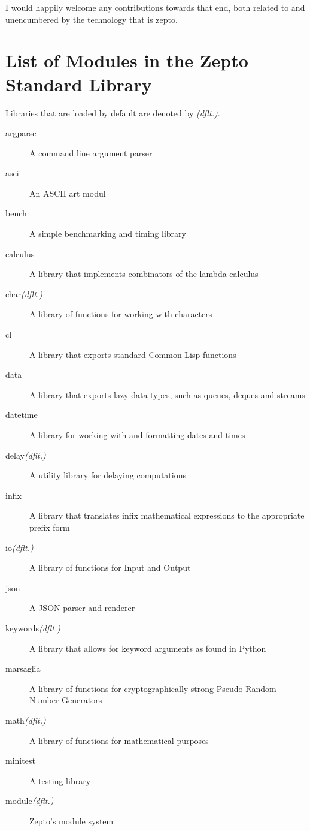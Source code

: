 \documentclass[oneside,11pt,xetex]{scrbook}
\begin{document}
I would happily welcome any contributions towards that
end, both related to and unencumbered by the technology
that is zepto.



\appendix

\chapter{List of Modules in the Zepto Standard Library}
\label{app:stdlib}

Libraries that are loaded by default are denoted by \textit{(dflt.)}.

\begin{description}
\item [argparse] A command line argument parser
\item [ascii] An ASCII art modul
\item [bench] A simple benchmarking and timing library
\item [calculus] A library that implements combinators of the lambda calculus
\item [char\textit{(dflt.)}] A library of functions for working with characters
\item [cl] A library that exports standard Common Lisp functions
\item [data] A library that exports lazy data types, such as queues, deques and streams
\item [datetime] A library for working with and formatting dates and times
\item [delay\textit{(dflt.)}] A utility library for delaying computations
\item [infix] A library that translates infix mathematical expressions to the appropriate
prefix form
\item [io\textit{(dflt.)}] A library of functions for Input and Output
\item [json] A JSON parser and renderer
\item [keywords\textit{(dflt.)}] A library that allows for keyword arguments as found in Python
\item [marsaglia] A library of functions for cryptographically strong Pseudo-Random Number Generators
\item [math\textit{(dflt.)}] A library of functions for mathematical purposes
\item [minitest] A testing library
\item [module\textit{(dflt.)}] Zepto's module system

\end{description}
\end{document}
